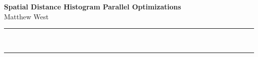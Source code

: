 \documentclass[a4paper,12pt]{article}
\renewenvironment{abstract}
{\par\noindent\textbf{\abstractname}\ \ignorespaces \\}
{\par\noindent\medskip}
\begin{document}
	\pagestyle{fancy}
	\thispagestyle{empty}
	\fancyhead[R]{\textit{}}
	\fancyhead[L]{}
	\renewcommand*{\thefootnote}{\fnsymbol{footnote}}
	\begin{center}
		\Large{\textbf{Spatial Distance Histogram Parallel Optimizations}}
		\vspace{0.4cm}
		\normalsize
		\\ Matthew West
		\vspace{0.1cm}
		\medskip
		\normalsize
	\end{center}
	{\color{gray}\hrule}
	\vspace{0.4cm}
	\begin{abstract}
		
	\end{abstract}
	{\color{gray}\hrule}
	\medskip
	
	
\end{document}
